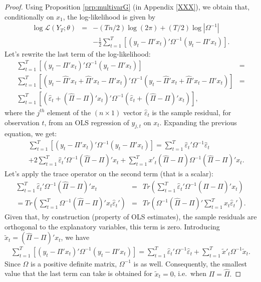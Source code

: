 \documentclass[
  12pt,
]{book}
\theoremstyle{definition}
\theoremstyle{definition}
\theoremstyle{definition}
\theoremstyle{definition}
\theoremstyle{remark}
\begin{document}
\begin{proof}
Using Proposition \ref{prp:multivarG} (in Appendix \ref{XXX}), we obtain that, conditionally on \(x_1\), the log-likelihood is given by
\begin{eqnarray*}
\log\mathcal{L}(Y_{T};\theta) & = & -(Tn/2)\log(2\pi)+(T/2)\log\left|\Omega^{-1}\right|\\
&  & -\frac{1}{2}\sum_{t=1}^{T}\left[\left(y_{t}-\Pi'x_{t}\right)'\Omega^{-1}\left(y_{t}-\Pi'x_{t}\right)\right].
\end{eqnarray*}
Let's rewrite the last term of the log-likelihood:
\begin{eqnarray*}
\sum_{t=1}^{T}\left[\left(y_{t}-\Pi'x_{t}\right)'\Omega^{-1}\left(y_{t}-\Pi'x_{t}\right)\right] & =\\
\sum_{t=1}^{T}\left[\left(y_{t}-\hat{\Pi}'x_{t}+\hat{\Pi}'x_{t}-\Pi'x_{t}\right)'\Omega^{-1}\left(y_{t}-\hat{\Pi}'x_{t}+\hat{\Pi}'x_{t}-\Pi'x_{t}\right)\right] & =\\
\sum_{t=1}^{T}\left[\left(\hat{\varepsilon}_{t}+(\hat{\Pi}-\Pi)'x_{t}\right)'\Omega^{-1}\left(\hat{\varepsilon}_{t}+(\hat{\Pi}-\Pi)'x_{t}\right)\right],
\end{eqnarray*}
where the \(j^{th}\) element of the \((n\times1)\) vector \(\hat{\varepsilon}_{t}\) is the sample residual, for observation \(t\), from an OLS regression of \(y_{j,t}\) on \(x_{t}\). Expanding the previous equation, we get:
\begin{eqnarray*}
&&\sum_{t=1}^{T}\left[\left(y_{t}-\Pi'x_{t}\right)'\Omega^{-1}\left(y_{t}-\Pi'x_{t}\right)\right]  = \sum_{t=1}^{T}\hat{\varepsilon}_{t}'\Omega^{-1}\hat{\varepsilon}_{t}\\
&&+2\sum_{t=1}^{T}\hat{\varepsilon}_{t}'\Omega^{-1}(\hat{\Pi}-\Pi)'x_{t}+\sum_{t=1}^{T}x'_{t}(\hat{\Pi}-\Pi)\Omega^{-1}(\hat{\Pi}-\Pi)'x_{t}.
\end{eqnarray*}
Let's apply the trace operator on the second term (that is a scalar):
\begin{eqnarray*}
\sum_{t=1}^{T}\hat{\varepsilon}_{t}'\Omega^{-1}(\hat{\Pi}-\Pi)'x_{t} & = & Tr\left(\sum_{t=1}^{T}\hat{\varepsilon}_{t}'\Omega^{-1}(\hat{\Pi}-\Pi)'x_{t}\right)\\
=  Tr\left(\sum_{t=1}^{T}\Omega^{-1}(\hat{\Pi}-\Pi)'x_{t}\hat{\varepsilon}_{t}'\right) & = & Tr\left(\Omega^{-1}(\hat{\Pi}-\Pi)'\sum_{t=1}^{T}x_{t}\hat{\varepsilon}_{t}'\right).
\end{eqnarray*}
Given that, by construction (property of OLS estimates), the sample residuals are orthogonal to the explanatory variables, this term is zero. Introducing \(\tilde{x}_{t}=(\hat{\Pi}-\Pi)'x_{t}\), we have
\begin{eqnarray*}
\sum_{t=1}^{T}\left[\left(y_{t}-\Pi'x_{t}\right)'\Omega^{-1}\left(y_{t}-\Pi'x_{t}\right)\right] =\sum_{t=1}^{T}\hat{\varepsilon}_{t}'\Omega^{-1}\hat{\varepsilon}_{t}+\sum_{t=1}^{T}\tilde{x}'_{t}\Omega^{-1}\tilde{x}_{t}.
\end{eqnarray*}
Since \(\Omega\) is a positive definite matrix, \(\Omega^{-1}\) is as well. Consequently, the smallest value that the last term can take is obtained for \(\tilde{x}_{t}=0\), i.e.~when \(\Pi=\hat{\Pi}.\)


\end{proof}
\end{document}

